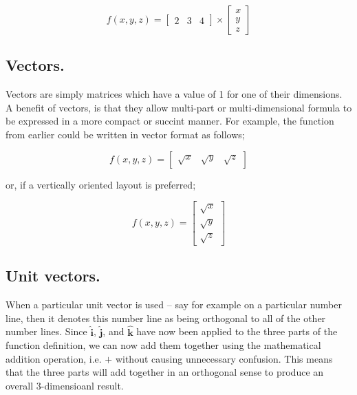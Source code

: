 \documentclass{article}
\begin{document}
\begin{equation*}
f(x,y,z)= 
\begin{bmatrix}
2 & 3 & 4
\end{bmatrix}
\times
\begin{bmatrix}
x \\
y \\
z
\end{bmatrix}
\end{equation*}

 
\subsection{Vectors.}

Vectors are simply matrices which have a value of 1 for one of their dimensions. A benefit of vectors, is that 
they allow multi-part or multi-dimensional formula to be expressed in a more compact or succint manner. For example,
the function from earlier could be written in vector format as follows;

\begin{equation*}
f(x,y,z) = 
\begin{bmatrix}
\sqrt{x} & \sqrt{y} & \sqrt{z}
\end{bmatrix}
\end{equation*}

or, if a vertically oriented layout is preferred;

\begin{equation*}
f(x,y,z) = 
\begin{bmatrix}
\sqrt{x} \\
\sqrt{y} \\
\sqrt{z}
\end{bmatrix}
\end{equation*}


\subsection{Unit vectors.}

When a particular unit vector is used -- say for example
on a particular number line, then it denotes this number line as being orthogonal to all of the other number lines.
Since $\hat{\mathrm{\bm{i}}}$, $\hat{\mathrm{\bm{j}}}$, and $\hat{\mathrm{\bm{k}}}$ have now been applied
to the three parts of the function definition, we can now add them together using the mathematical addition operation,
i.e. $+$ without causing unnecessary confusion. This means that the three parts will add together in an orthogonal
sense to produce an overall 3-dimensioanl result.\\
\end{document}
